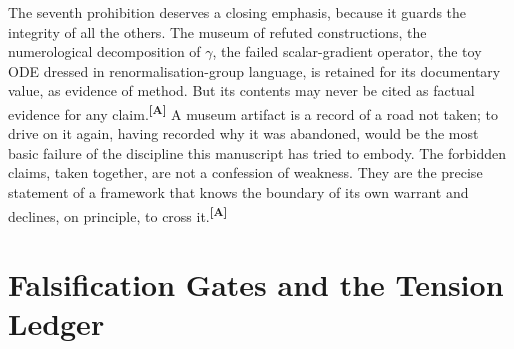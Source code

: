 \documentclass[12pt,a4paper,twoside]{article}
\theoremstyle{plain}
\theoremstyle{definition}
\theoremstyle{remark}
\newcommand{\catmark}[1]{\textsuperscript{\textsf{\textbf{[#1]}}}}
\begin{document}
\noindent The seventh prohibition deserves a closing emphasis, because it guards the integrity of all the others. The museum of refuted constructions, the numerological decomposition of $\gamma$, the failed scalar-gradient operator, the toy ODE dressed in renormalisation-group language, is retained for its documentary value, as evidence of method. But its contents may never be cited as factual evidence for any claim.\catmark{A} A museum artifact is a record of a road not taken; to drive on it again, having recorded why it was abandoned, would be the most basic failure of the discipline this manuscript has tried to embody. The forbidden claims, taken together, are not a confession of weakness. They are the precise statement of a framework that knows the boundary of its own warrant and declines, on principle, to cross it.\catmark{A}


\section{Falsification Gates and the Tension Ledger}
\label{sec:falsification-tension}
\end{document}
